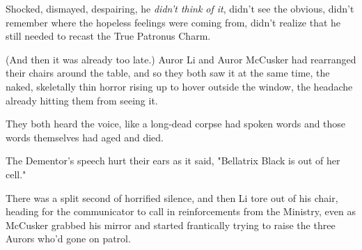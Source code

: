 Shocked, dismayed, despairing, he \emph{didn't think of it}, didn't see the 
obvious, didn't remember where the hopeless feelings were coming from, didn't 
realize that he still needed to recast the True Patronus Charm.

(And then it was already too late.)
\sbreak
Auror Li and Auror McCusker had rearranged their chairs around the table, and 
so they both saw it at the same time, the naked, skeletally thin horror rising 
up to hover outside the window, the headache already hitting them from seeing 
it.

They both heard the voice, like a long-dead corpse had spoken words and those 
words themselves had aged and died.

The Dementor's speech hurt their ears as it said, "Bellatrix Black is out of 
her cell."

There was a split second of horrified silence, and then Li tore out of his 
chair, heading for the communicator to call in reinforcements from the 
Ministry, even as McCusker grabbed his mirror and started frantically trying to 
raise the three Aurors who'd gone on patrol.